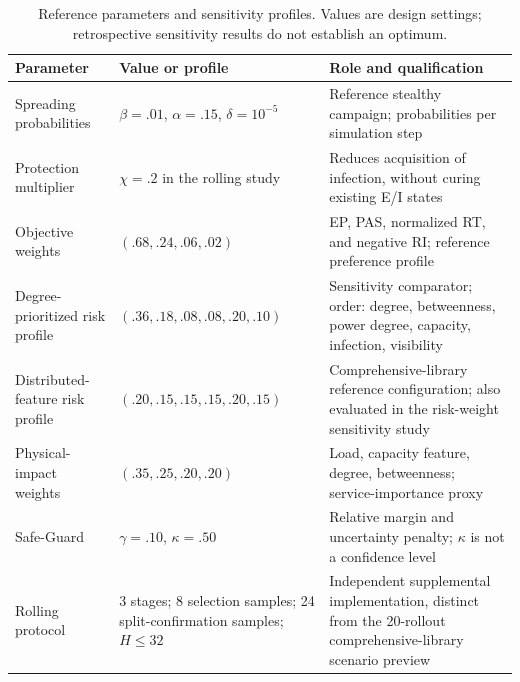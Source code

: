 \begin{table}[!htbp]
\centering\small
\caption{Reference parameters and sensitivity profiles. Values are design settings; retrospective sensitivity results do not establish an optimum.}
\label{tab:weights}
\begin{tabularx}{\textwidth}{p{}p{}X}
\toprule
Parameter & Value or profile & Role and qualification\\
\midrule
Spreading probabilities & $\beta=.01$, $\alpha=.15$, $\delta=10^{-5}$ & Reference stealthy campaign; probabilities per simulation step\\
Protection multiplier & $\chi=.2$ in the rolling study & Reduces acquisition of infection, without curing existing E/I states\\
Objective weights & $(.68,.24,.06,.02)$ & EP, PAS, normalized RT, and negative RI; reference preference profile\\
Degree-prioritized risk profile & $(.36,.18,.08,.08,.20,.10)$ & Sensitivity comparator; order: degree, betweenness, power degree, capacity, infection, visibility\\
Distributed-feature risk profile & $(.20,.15,.15,.15,.20,.15)$ & Comprehensive-library reference configuration; also evaluated in the risk-weight sensitivity study\\
Physical-impact weights & $(.35,.25,.20,.20)$ & Load, capacity feature, degree, betweenness; service-importance proxy\\
Safe-Guard & $\gamma=.10$, $\kappa=.50$ & Relative margin and uncertainty penalty; $\kappa$ is not a confidence level\\
Rolling protocol & 3 stages; 8 selection samples; 24 split-confirmation samples; $H\leq32$ & Independent supplemental implementation, distinct from the 20-rollout comprehensive-library scenario preview\\
\bottomrule
\end{tabularx}
\end{table}
